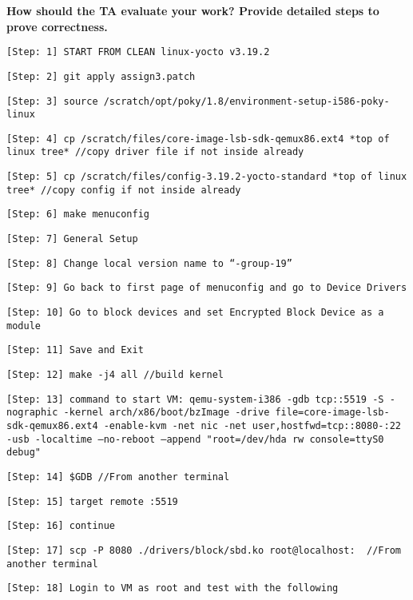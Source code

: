 \documentclass[10pt,letterpaper,draftclsnofoot,onecolumn]{IEEEtran}
\begin{document}
\noindent\textbf{How should the TA evaluate your work? Provide detailed steps to prove correctness.}
\begin{description}
\item \texttt{[Step: 1] START FROM CLEAN linux-yocto v3.19.2}
\item \texttt{[Step: 2] git apply assign3.patch}
\item \texttt{[Step: 3] source /scratch/opt/poky/1.8/environment-setup-i586-poky-linux}
\item \texttt{[Step: 4] cp /scratch/files/core-image-lsb-sdk-qemux86.ext4 *top of linux tree* \newline //copy driver file if not inside already}
\item \texttt{[Step: 5] cp /scratch/files/config-3.19.2-yocto-standard *top of linux tree* \newline//copy config if not inside already}
\item \texttt{[Step: 6] make menuconfig}
\item \texttt{[Step: 7] General Setup}
\item \texttt{[Step: 8] Change local version name to “-group-19”}
\item \texttt{[Step: 9] Go back to first page of menuconfig and go to Device Drivers}
\item \texttt{[Step: 10] Go to block devices and set Encrypted Block Device as a module}
\item \texttt{[Step: 11] Save and Exit}
\item \texttt{[Step: 12] make -j4 all \newline //build kernel}
\item \texttt{[Step: 13] command to start VM: \newline qemu-system-i386 -gdb tcp::5519 -S -nographic -kernel arch/x86/boot/bzImage -drive file=core-image-lsb-sdk-qemux86.ext4 -enable-kvm -net nic -net user,hostfwd=tcp::8080-:22 -usb -localtime --no-reboot --append "root=/dev/hda rw console=ttyS0 debug"}
\item \texttt{[Step: 14] \$GDB \newline //From another terminal}
\item \texttt{[Step: 15] target remote :5519}
\item \texttt{[Step: 16] continue}
\item \texttt{[Step: 17] scp -P 8080 ./drivers/block/sbd.ko root@localhost:~ \newline //From another terminal}
\item \texttt{[Step: 18] Login to VM as root and test with the following}

\end{description}
\end{document}
